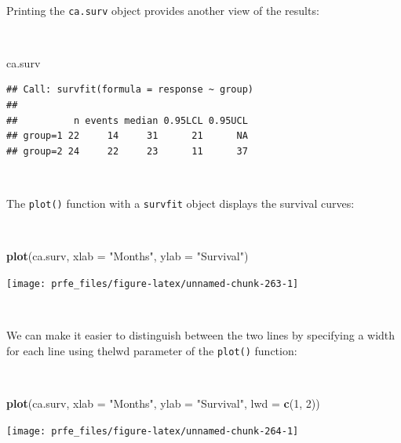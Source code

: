 \documentclass[12pt,a4paper]{book}
\newenvironment{Shaded}{\begin{snugshade}}{\end{snugshade}}
\newcommand{\DataTypeTok}[1]{\textcolor[rgb]{0.13,0.29,0.53}{#1}}
\newcommand{\DecValTok}[1]{\textcolor[rgb]{0.00,0.00,0.81}{#1}}
\newcommand{\KeywordTok}[1]{\textcolor[rgb]{0.13,0.29,0.53}{\textbf{#1}}}
\newcommand{\NormalTok}[1]{#1}
\newcommand{\StringTok}[1]{\textcolor[rgb]{0.31,0.60,0.02}{#1}}
\theoremstyle{definition}
\theoremstyle{definition}
\theoremstyle{definition}
\theoremstyle{remark}
\begin{document}
~

Printing the \texttt{ca.surv} object provides another view of the
results:

~

\begin{Shaded}
\begin{Highlighting}[]
\NormalTok{ca.surv}
\end{Highlighting}
\end{Shaded}

\begin{verbatim}
## Call: survfit(formula = response ~ group)
## 
##          n events median 0.95LCL 0.95UCL
## group=1 22     14     31      21      NA
## group=2 24     22     23      11      37
\end{verbatim}

~

The \texttt{plot()} function with a \texttt{survfit} object displays the
survival curves:

~

\begin{Shaded}
\begin{Highlighting}[]
\KeywordTok{plot}\NormalTok{(ca.surv, }\DataTypeTok{xlab =} \StringTok{"Months"}\NormalTok{, }\DataTypeTok{ylab =} \StringTok{"Survival"}\NormalTok{)}
\end{Highlighting}
\end{Shaded}

\begin{center}\texttt{[image: prfe\_files/figure-latex/unnamed-chunk-263-1]} \end{center}

~

We can make it easier to distinguish between the two lines by specifying
a width for each line using thelwd parameter of the \texttt{plot()}
function:

~

\begin{Shaded}
\begin{Highlighting}[]
\KeywordTok{plot}\NormalTok{(ca.surv, }\DataTypeTok{xlab =} \StringTok{"Months"}\NormalTok{, }\DataTypeTok{ylab =} \StringTok{"Survival"}\NormalTok{, }\DataTypeTok{lwd =} \KeywordTok{c}\NormalTok{(}\DecValTok{1}\NormalTok{, }\DecValTok{2}\NormalTok{))}
\end{Highlighting}
\end{Shaded}

\begin{center}\texttt{[image: prfe\_files/figure-latex/unnamed-chunk-264-1]} \end{center}
\end{document}
